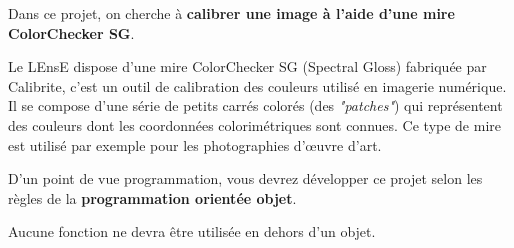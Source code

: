 Dans ce projet, on cherche à \textbf{calibrer une image à l'aide d'une mire ColorChecker SG}.

Le LEnsE dispose d'une mire ColorChecker SG (Spectral Gloss) fabriquée par Calibrite, c'est un outil de calibration des couleurs utilisé en imagerie numérique. Il se compose d'une série de petits carrés colorés (des \textit{"patches"}) qui représentent des couleurs dont les coordonnées colorimétriques sont connues. Ce type de mire est utilisé par exemple pour les photographies d'œuvre d'art. 


\medskip

D'un point de vue programmation, vous devrez développer ce projet selon les règles de la \textbf{programmation orientée objet}.

Aucune fonction ne devra être utilisée en dehors d'un objet.